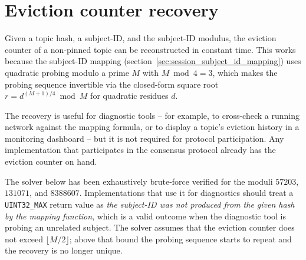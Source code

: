 \chapter{Eviction counter recovery}\label{sec:appendix_eviction_solver}

Given a topic hash, a subject-ID, and the subject-ID modulus, the eviction
counter of a non-pinned topic can be reconstructed in constant time.
This works because the subject-ID mapping
(section~\ref{sec:session_subject_id_mapping})
uses quadratic probing modulo a prime $M$ with $M \bmod 4 = 3$, which makes
the probing sequence invertible via the closed-form square root
$r = d^{(M+1)/4} \bmod M$ for quadratic residues $d$.

The recovery is useful for diagnostic tools -- for example, to cross-check a
running network against the mapping formula, or to display a topic's
eviction history in a monitoring dashboard -- but it is not required for
protocol participation. Any implementation that participates in the
consensus protocol already has the eviction counter on hand.

\begin{remark}
    The solver below has been exhaustively brute-force verified for the
    moduli $57203$, $131071$, and $8388607$.
    Implementations that use it for diagnostics should treat a
    \texttt{UINT32\_MAX} return value as \emph{the subject-ID was not
    produced from the given hash by the mapping function}, which is a valid
    outcome when the diagnostic tool is probing an unrelated subject.
    The solver assumes that the eviction counter does not exceed
    $\lfloor M / 2 \rfloor$; above that bound the probing sequence starts
    to repeat and the recovery is no longer unique.
\end{remark}

